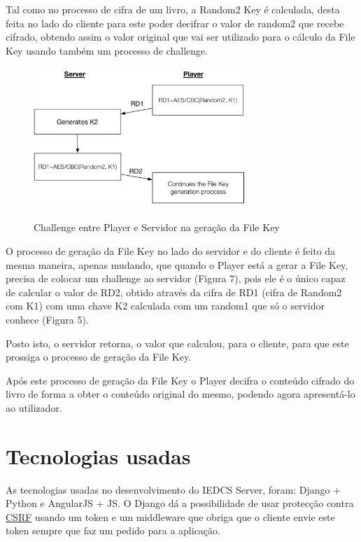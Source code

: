 \documentclass[pdftex,12pt,a4paper]{report}
\begin{document}
Tal como no processo de cifra de um livro, a Random2 Key é calculada, desta feita no lado do cliente para este poder decifrar o valor de random2 que recebe cifrado, obtendo assim o valor original que vai ser utilizado para o cálculo da File Key usando também um processo de challenge.

\begin{figure}[!htb]
\center
 \includegraphics[width=80mm,scale=1]{challengefilekey.pdf}
 \caption{\\Challenge entre Player e Servidor na geração da File Key}
 \label{fig:eer}
\end{figure}

O processo de geração da File Key no lado do servidor e do cliente é feito da mesma maneira, apenas mudando, que quando o Player está a gerar a File Key, precisa de colocar um challenge ao servidor (Figura 7), pois ele é o único capaz de calcular o valor de RD2, obtido através da cifra de RD1 (cifra de Random2 com K1) com uma chave K2 calculada com um random1 que só o servidor conhece (Figura 5). 

Posto isto, o servidor retorna, o valor que calculou, para o cliente, para que este prossiga o processo de geração da File Key. 

Após este processo de geração da File Key o Player decifra o conteúdo cifrado do livro de forma a obter o conteúdo original do mesmo, podendo agora apresentá-lo ao utilizador.

\section{Tecnologias usadas}

As tecnologias usadas no desenvolvimento do IEDCS Server, foram: Django + Python e AngularJS + JS. O Django dá a possibilidade de usar protecção contra \href{https://docs.djangoproject.com/en/1.8/ref/csrf/}{CSRF} usando um token e um middleware que obriga que o cliente envie este token sempre que faz um pedido para a aplicação.  
\end{document}
